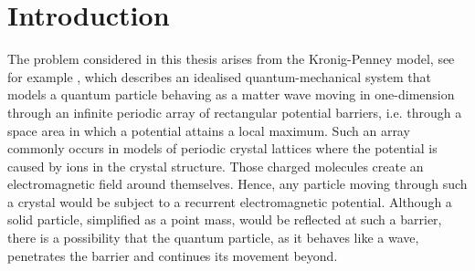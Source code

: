 \chapter{Introduction} \label{chap:1}

The problem considered in this thesis arises from the Kronig-Penney model, see for example \cite[Chap. 3]{heering2002elektrophysik}, which describes an idealised quantum-mechanical system that models a quantum particle behaving as a matter wave moving in one-dimension through an infinite periodic array of rectangular potential barriers, i.e. through a space area in which a potential attains a local maximum. Such an array commonly occurs in models of periodic crystal lattices where the potential is caused by ions in the crystal structure. Those charged molecules create an electromagnetic field around themselves. Hence, any particle moving through such a crystal would be subject to a recurrent electromagnetic potential. Although a solid particle, simplified as a point mass, would be reflected at such a barrier, there is a possibility that the quantum particle, as it behaves like a wave, penetrates the barrier and continues its movement beyond. 
~\\

